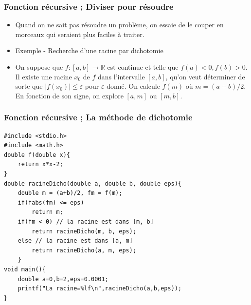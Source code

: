 \documentclass{beamer}
\begin{document}

\begin{frame}[fragile]
\frametitle{Fonction récursive ; Diviser pour résoudre}

\begin{itemize}
\item Quand on ne sait pas résoudre un problème, on essaie de le couper en morceaux qui seraient plus faciles à traiter. 
\item Exemple - Recherche d'une racine par dichotomie 
\item On suppose que $f :[a, b] \to \mathbb{R}$ est continue et telle que $f(a) < 0, f(b) > 0$. Il existe une racine $x_0$ de $f$ dans l'intervalle $[a, b]$, qu'on veut déterminer de sorte que $|f(x_0)| \leq \varepsilon$ pour $\varepsilon$ donné. On calcule $f(m)$ où $m=(a+b)/2$. En fonction de son signe, on explore $[a, m]$ ou $[m, b]$.
\end{itemize}

\begin{center}
 \end{center}


\end{frame}


\begin{frame}[fragile]
\frametitle{Fonction récursive ; La méthode de dichotomie}
\begin{verbatim}  
#include <stdio.h>
#include <math.h> 
double f(double x){ 
    return x*x-2; 
} 
double racineDicho(double a, double b, double eps){ 
    double m = (a+b)/2, fm = f(m); 
    if(fabs(fm) <= eps) 
        return m; 
    if(fm < 0) // la racine est dans [m, b] 
        return racineDicho(m, b, eps); 
    else // la racine est dans [a, m] 
        return racineDicho(a, m, eps);
    } 
void main(){ 
    double a=0,b=2,eps=0.0001; 
    printf("La racine=%lf\n",racineDicho(a,b,eps)); 
}

\end{verbatim}


\end{frame}
\end{document}
